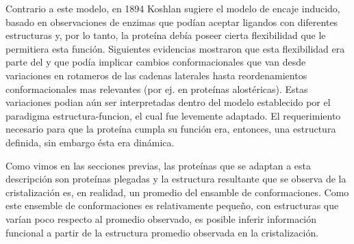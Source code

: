 Contrario a este modelo, en 1894 Koshlan sugiere el modelo de encaje inducido, basado en observaciones de enzimas que podían aceptar 
ligandos con diferentes estructuras y, por lo tanto, la proteína debía poseer cierta flexibilidad que le permitiera esta función.
Siguientes evidencias mostraron que esta flexibilidad era parte del  y que podía implicar cambios conformacionales que van desde variaciones en rotameros de las cadenas laterales hasta reordenamientos conformacionales mas relevantes
(por ej. en proteínas alostéricas).
Estas variaciones podian aún ser interpretadas dentro del modelo establecido por el paradigma estructura-funcion, el cual fue levemente adaptado.
El requerimiento necesario para que la proteína cumpla su función era, entonces, una estructura definida, sin embargo ésta era dinámica. 

Como vimos en las secciones previas, las proteínas que se adaptan a esta descripción son proteínas plegadas y la estructura resultante que se observa de la cristalización es, en realidad, un promedio del ensamble de conformaciones.
Como este ensemble de conformaciones es relativamente pequeño, con estructuras que varían poco respecto al promedio observado, es posible inferir información funcional a partir de la estructura promedio observada en la cristalización.

